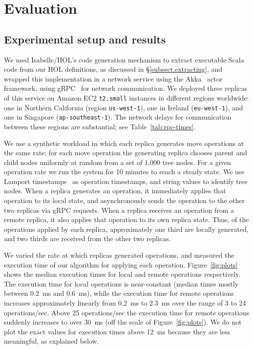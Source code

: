 \documentclass[sigplan,anonymous]{acmart}
\begin{document}
\section{Evaluation}\label{sec:evaluation}

\subsection{Experimental setup and results}

We used Isabelle/HOL's code generation mechanism to extract executable Scala code from our HOL definitions, as discussed in \S\ref{subsect.extracting}, and wrapped this implementation in a network service using the Akka~\cite{Akka} actor framework, using gRPC~\cite{gRPC} for network communication.
We deployed three replicas of this service on Amazon EC2 \texttt{t2.small} instances in different regions worldwide: one in Northern California (region \texttt{us-west-1}), one in Ireland (\texttt{eu-west-1}), and one in Singapore (\texttt{ap-southeast-1}).
The network delays for communication between these regions are substantial; see Table~\ref{tab:rpc-times}.

We use a synthetic workload in which each replica generates move operations at the same rate; for each move operation the generating replica chooses parent and child nodes uniformly at random from a set of 1,000 tree nodes.
For a given operation rate we run the system for 10 minutes to reach a steady state.
We use Lamport timestamps~\cite{Lamport:1978jq} as operation timestamps, and string values to identify tree nodes.
When a replica generates an operation, it immediately applies that operation to its local state, and asynchronously sends the operation to the other two replicas via gRPC requests.
When a replica receives an operation from a remote replica, it also applies that operation to its own replica state.
Thus, of the operations applied by each replica, approximately one third are locally generated, and two thirds are received from the other two replicas.

We varied the rate at which replicas generated operations, and measured the execution time of our algorithm for applying each operation.
Figure~\ref{fig:plots} shows the median execution times for local and remote operations respectively.
The execution time for local operations is near-constant (median times mostly between 0.2~ms and 0.6~ms), while the execution time for remote operations increases approximately linearly from 0.2~ms to 2.3~ms over the range of 3 to 24 operations/sec.
Above 25 operations/sec the execution time for remote operations suddenly increases to over 30~ms (off the scale of Figure~\ref{fig:plots}).
We do not plot the exact values for execution times above 12~ms because they are less meaningful, as explained below.
\end{document}
